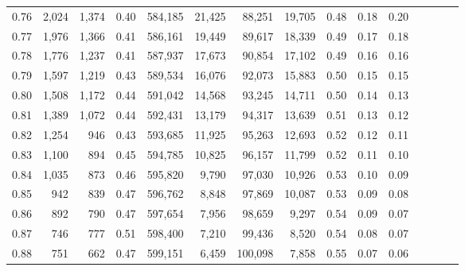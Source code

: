 \begin{tabular}{rrrcrrrrrrrrrrr}
0.76 &   2,024 &  1,374 &                                       0.40 &  584,185 &   21,425 &   88,251 &   19,705 &  0.48 &  0.18 &                         0.20 \\
0.77 &   1,976 &  1,366 &                                       0.41 &  586,161 &   19,449 &   89,617 &   18,339 &  0.49 &  0.17 &                         0.18 \\
0.78 &   1,776 &  1,237 &                                       0.41 &  587,937 &   17,673 &   90,854 &   17,102 &  0.49 &  0.16 &                         0.16 \\
0.79 &   1,597 &  1,219 &                                       0.43 &  589,534 &   16,076 &   92,073 &   15,883 &  0.50 &  0.15 &                         0.15 \\
0.80 &   1,508 &  1,172 &                                       0.44 &  591,042 &   14,568 &   93,245 &   14,711 &  0.50 &  0.14 &                         0.13 \\
0.81 &   1,389 &  1,072 &                                       0.44 &  592,431 &   13,179 &   94,317 &   13,639 &  0.51 &  0.13 &                         0.12 \\
0.82 &   1,254 &    946 &                                       0.43 &  593,685 &   11,925 &   95,263 &   12,693 &  0.52 &  0.12 &                         0.11 \\
0.83 &   1,100 &    894 &                                       0.45 &  594,785 &   10,825 &   96,157 &   11,799 &  0.52 &  0.11 &                         0.10 \\
0.84 &   1,035 &    873 &                                       0.46 &  595,820 &    9,790 &   97,030 &   10,926 &  0.53 &  0.10 &                         0.09 \\
0.85 &     942 &    839 &                                       0.47 &  596,762 &    8,848 &   97,869 &   10,087 &  0.53 &  0.09 &                         0.08 \\
0.86 &     892 &    790 &                                       0.47 &  597,654 &    7,956 &   98,659 &    9,297 &  0.54 &  0.09 &                         0.07 \\
0.87 &     746 &    777 &                                       0.51 &  598,400 &    7,210 &   99,436 &    8,520 &  0.54 &  0.08 &                         0.07 \\
0.88 &     751 &    662 &                                       0.47 &  599,151 &    6,459 &  100,098 &    7,858 &  0.55 &  0.07 &                         0.06 \\

\end{tabular}
